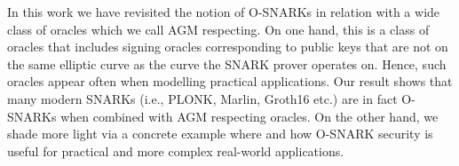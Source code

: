 In this work we have revisited the notion of O-SNARKs in relation with a wide class of oracles which we call AGM 
respecting. On one hand, this is a class of oracles that includes signing oracles corresponding to public keys that 
are not on the same elliptic curve as the curve the SNARK prover operates on. Hence, such oracles appear often 
when modelling practical applications. Our result shows that many modern SNARKs (i.e., PLONK, Marlin, Groth16 etc.) 
are in fact O-SNARKs when combined with AGM respecting oracles. On the other hand, we shade more light via a concrete 
example where and how O-SNARK security is useful for practical and more complex real-world applications. 

